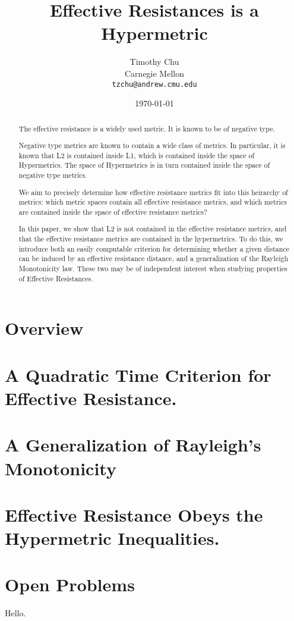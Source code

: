 
\title{
  Effective Resistances is a Hypermetric
}
\author{Timothy Chu\\
  Carnegie Mellon \\
    \texttt{tzchu@andrew.cmu.edu}
}
\date{\today}


\maketitle
\thispagestyle{empty}

\begin{abstract} The effective resistance is a widely used metric.
It is known to be of negative type.

Negative type metrics are known to contain a wide class of metrics. In
particular, it is known that L2 is contained inside L1, which is
contained inside the space of Hypermetrics. The space of Hypermetrics is
in turn contained inside the space of negative type metrics.

We aim to precisely determine how effective resistance metrics fit into
this heirarchy of metrics: which metric spaces contain all effective
resistance metrics, and which metrics are contained inside the space of
effective resistance metrics?

In this paper, we show that L2 is not contained in the effective
resistance metrics, and that the effective resistance metrics are
contained in the hypermetrics.
To do this, we introduce both an easily computable criterion for
determining whether a given distance can be induced by an effective
resistance distance, and a generalization of the Rayleigh
Monotonicity law. These two may be of independent interest when
studying properties of Effective Resistances.

\end{abstract}

\section{Overview}
\section{A Quadratic Time Criterion for Effective Resistance.}
\section{A Generalization of Rayleigh's Monotonicity}
\section{Effective Resistance Obeys the Hypermetric Inequalities.}
\section{Open Problems}
Hello.

